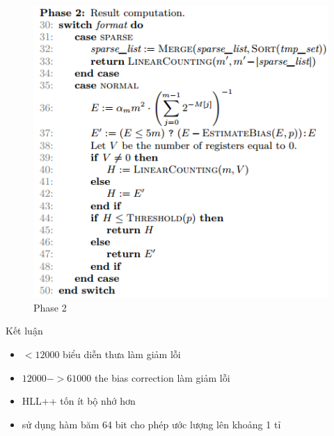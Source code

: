 \documentclass{beamer}
\begin{document}
\begin{frame}
\begin{figure}[h]
\includegraphics[scale=0.6]{img7.png}
\caption{Phase 2}
\end{figure}

\end{frame}
\begin{frame}{Kết luận}
\begin{itemize}
\item $<12000$ biểu diễn thưa làm giảm lỗi
\item $12000->61000$ the bias correction làm giảm lỗi
\item HLL++ tốn ít bộ nhớ hơn
\item sử dụng hàm băm 64 bit cho phép ước lượng lên khoảng 1 tỉ
\end{itemize}

\end{frame}
\end{document}
